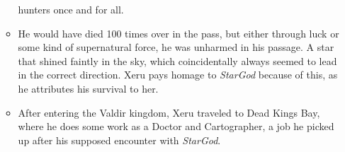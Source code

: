 \documentclass[12pt]{article}
\begin{document}
\begin{itemize}
\begin{itemize}
          hunters once and for all.
        \item He would have died 100 times over in the pass, but either through
          luck or some kind of supernatural force, he was unharmed in his
          passage. A star that shined faintly in the sky, which coincidentally
          always seemed to lead in the correct direction. Xeru pays homage to
          \textit{StarGod} because of this, as he attributes his survival to
          her.
        \item After entering the Valdir kingdom, Xeru traveled to Dead Kings
          Bay, where he does some work as a Doctor and Cartographer, a job he
          picked up after his supposed encounter with \textit{StarGod}.
      \end{itemize}
  \end{itemize}
\fi
\end{document}
